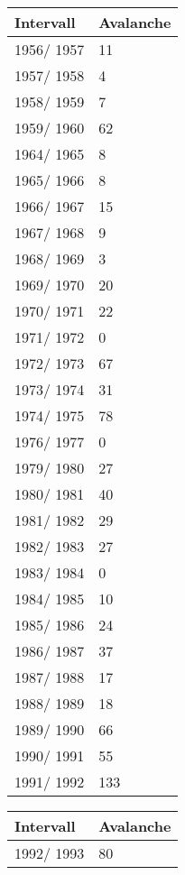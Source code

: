 \documentclass[../masterarbeit.tex]{subfiles}
\begin{document}
\begin{table}
    \centering
    \begin{tabular}{|l|l|}
    \hline
        Intervall & Avalanche \\ \hline
        1956/ 1957 & 11 \\ \hline
        1957/ 1958 & 4 \\ \hline
        1958/ 1959 & 7 \\ \hline
        1959/ 1960 & 62 \\ \hline
        1964/ 1965 & 8 \\ \hline
        1965/ 1966 & 8 \\ \hline
        1966/ 1967 & 15 \\ \hline
        1967/ 1968 & 9 \\ \hline
        1968/ 1969 & 3 \\ \hline
        1969/ 1970 & 20 \\ \hline
        1970/ 1971 & 22 \\ \hline
        1971/ 1972 & 0 \\ \hline
        1972/ 1973 & 67 \\ \hline
        1973/ 1974 & 31 \\ \hline
        1974/ 1975 & 78 \\ \hline
        1976/ 1977 & 0 \\ \hline
        1979/ 1980 & 27 \\ \hline
        1980/ 1981 & 40 \\ \hline
        1981/ 1982 & 29 \\ \hline
        1982/ 1983 & 27 \\ \hline
        1983/ 1984 & 0 \\ \hline
        1984/ 1985 & 10 \\ \hline
        1985/ 1986 & 24 \\ \hline
        1986/ 1987 & 37 \\ \hline
        1987/ 1988 & 17 \\ \hline
        1988/ 1989 & 18 \\ \hline
        1989/ 1990 & 66 \\ \hline
        1990/ 1991 & 55 \\ \hline
        1991/ 1992 & 133 \\ \hline
        \end{tabular}
        \begin{tabular}{|l|l|}
        \hline
        Intervall & Avalanche \\ \hline
        1992/ 1993 & 80 \\ \hline

\end{tabular}
\end{table}
\end{document}
